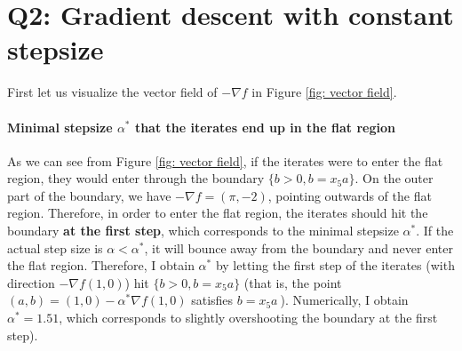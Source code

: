 \documentclass{article}
\begin{document}
\section*{Q2: Gradient descent with constant stepsize}
First let us visualize the vector field of $ -\nabla f $ in Figure \ref{fig: vector field}.

\paragraph{Minimal stepsize $ \alpha^{*}$ that the iterates end up in the flat region} As we can see from Figure \ref{fig: vector field}, if the iterates were to enter the flat region, they would enter through the boundary  $ \{b>0, b=x_5 a\} $. On the outer part of the boundary, we have  $ -\nabla f = (\pi,-2)$, pointing outwards of the flat region. Therefore, in order to enter the flat region, the iterates should hit the boundary \textbf{at the first step}, which corresponds to the minimal stepsize $ \alpha^{*} $. If the actual step size is $ \alpha < \alpha^{*} $, it will bounce away from the boundary and never enter the flat region. Therefore, I obtain $ \alpha^{*} $ by letting the first step of the iterates (with direction $ -\nabla f  (1,0)$) hit $ \{b>0, b=x_5 a\} $ (that is, the point$ (a,b) = (1,0) - \alpha^{*}\nabla f  (1,0)  $ satisfies $  b=x_5 a\ $). Numerically, I obtain $ \alpha^{*} = 1.51 $, which corresponds to slightly overshooting the boundary at the first step).
\end{document}
